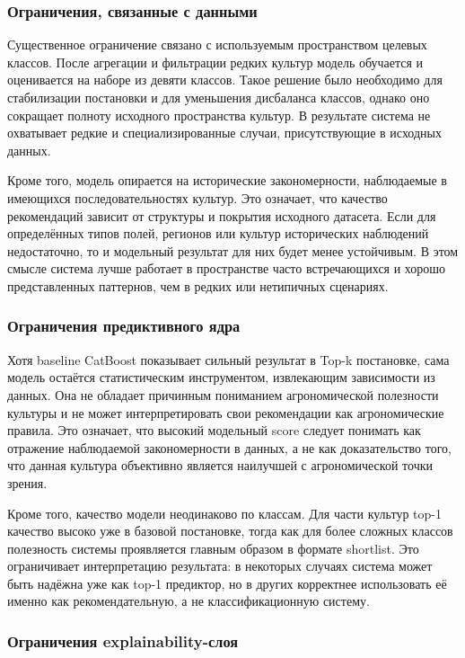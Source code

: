 \subsubsection{Ограничения, связанные с данными}

Существенное ограничение связано с используемым пространством целевых классов. После агрегации и фильтрации редких
культур модель обучается и оценивается на наборе из девяти классов. Такое решение было необходимо для стабилизации
постановки и для уменьшения дисбаланса классов, однако оно сокращает полноту исходного пространства культур. В
результате система не охватывает редкие и специализированные случаи, присутствующие в исходных данных.

Кроме того, модель опирается на исторические закономерности, наблюдаемые в имеющихся последовательностях культур. Это
означает, что качество рекомендаций зависит от структуры и покрытия исходного датасета. Если для определённых типов
полей, регионов или культур исторических наблюдений недостаточно, то и модельный результат для них будет менее
устойчивым. В этом смысле система лучше работает в пространстве часто встречающихся и хорошо представленных паттернов,
чем в редких или нетипичных сценариях.

\subsubsection{Ограничения предиктивного ядра}

Хотя baseline CatBoost показывает сильный результат в Top-k постановке, сама модель остаётся статистическим
инструментом, извлекающим зависимости из данных. Она не обладает причинным пониманием агрономической полезности культуры
и не может интерпретировать свои рекомендации как агрономические правила. Это означает, что высокий модельный score
следует понимать как отражение наблюдаемой закономерности в данных, а не как доказательство того, что данная культура
объективно является наилучшей с агрономической точки зрения.

Кроме того, качество модели неодинаково по классам. Для части культур top-1 качество высоко уже в базовой постановке,
тогда как для более сложных классов полезность системы проявляется главным образом в формате shortlist. Это ограничивает
интерпретацию результата: в некоторых случаях система может быть надёжна уже как top-1 предиктор, но в других корректнее
использовать её именно как рекомендательную, а не классификационную систему.

\subsubsection{Ограничения explainability-слоя}

